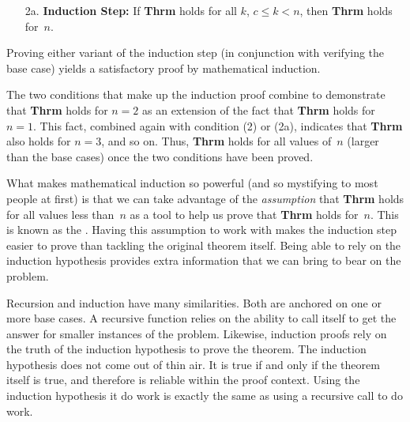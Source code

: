 \begin{enumerate}
\item[2a.]
\textbf{Induction Step:}
If \textbf{Thrm} holds for all \(k\), \(c \leq k < n\), then
\textbf{Thrm} holds for~\(n\).
\end{enumerate}

\noindent Proving either variant of the induction step (in
conjunction with verifying the base case) yields a satisfactory proof
by mathematical induction.

The two conditions that make up the induction proof combine to
demonstrate that \textbf{Thrm} holds for \(n=2\) as an extension of the
fact that \textbf{Thrm} holds for \(n=1\).
This fact, combined again with condition (2) or (2a), indicates
that \textbf{Thrm} also holds for \(n=3\), and so on.
Thus, \textbf{Thrm} holds for all values of~\(n\) (larger than the
base cases) once the two conditions have been proved.

What makes mathematical induction so powerful (and so mystifying to
most people at first) is that we can take advantage of the
\emph{assumption} that \textbf{Thrm} holds for all values less
than~\(n\) as a tool to help us prove that \textbf{Thrm} holds
for~\(n\).
This is known as the .
Having this assumption to work with makes the induction step
easier to prove than tackling the original theorem itself.
Being able to rely on the induction hypothesis provides extra
information that we can bring to bear on the problem.

Recursion and induction have many similarities.
Both are anchored on one or more base cases. 
A recursive function relies on the ability to call itself to get the
answer for smaller instances of the problem.
Likewise, induction proofs rely on the truth of the induction
hypothesis to prove the theorem.
The induction hypothesis does not come out of thin air.
It is true if and only if the theorem itself is true, and
therefore is reliable within the proof context.
Using the induction hypothesis it do work is exactly the same as using
a recursive call to do work.

